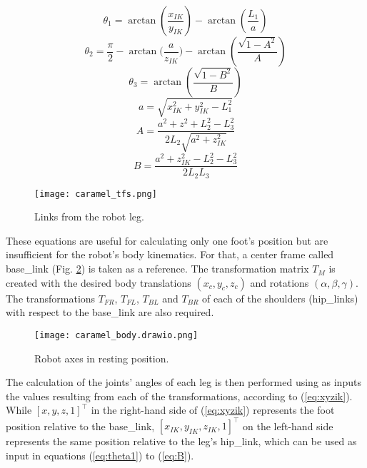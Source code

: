 \documentclass[conference]{IEEEtran}
\begin{document}
\begin{equation}
  \label{eq:theta1}
  \theta_1 = \arctan{(\frac{x_{IK}}{y_{IK}})} - \arctan{(\frac{L_1}{a})}
\end{equation}
\begin{equation}
  \label{eq:theta2}
  \theta_2 = \frac{\pi}{2} - \arctan{(\frac{a}{z_{IK}}}) - \arctan{(\frac{\sqrt{1-A^2}}{A})}
\end{equation}
\begin{equation}
  \label{eq:theta3}
  \theta_3 = \arctan(\frac{\sqrt{1-B^2}}{B})
\end{equation}
\begin{equation}
  \label{eq:a}
  a = \sqrt{x_{IK}^2+y_{IK}^2-L_1^2}
\end{equation}
\begin{equation}
  \label{eq:A}
  A =\frac{a^2+z^2+L_2^2-L_3^2}{2L_2\sqrt{a^2+z_{IK}^2}}
\end{equation}
\begin{equation}
  \label{eq:B}
  B = \frac{a^2+z_{IK}^2-L_2^2-L_3^2}{2L_2L_3}
\end{equation}

\begin{figure}[tb]
  \centering
  \texttt{[image: caramel\_tfs.png]}
  
  \caption{Links from the robot leg.}
  \label{fig:caramel_tfs}
\end{figure}

These equations are useful for calculating only one foot's position but are insufficient for the robot's body kinematics. For that, a center frame called base\_link (Fig. \ref{fig:caramel_body}) is taken as a reference. The transformation matrix $T_M$ is created with the desired body translations $(x_c, y_c, z_c)$ and rotations $(\alpha, \beta, \gamma)$. The transformations $T_{FR}$, $T_{FL}$, $T_{BL}$ and $T_{BR}$ of each of the shoulders (hip\_links) with respect to the base\_link are also required.

\begin{figure}[tb]
  \centering
  \vspace{-0.75cm}
  \texttt{[image: caramel\_body.drawio.png]}
  
  \caption{Robot axes in resting position.}
  \label{fig:caramel_body}
\end{figure}

The calculation of the joints' angles of each leg is then performed using as inputs the values resulting from each of the transformations, according to (\ref{eq:xyzik}). While $[x, y, z, 1]^\top$ in the right-hand side of (\ref{eq:xyzik}) represents the foot position relative to the base\_link, $[x_{IK}, y_{IK}, z_{IK}, 1]^\top$ on the left-hand side represents the same position relative to the leg's hip\_link, which can be used as input in equations (\ref{eq:theta1}) to (\ref{eq:B}). 
\end{document}
